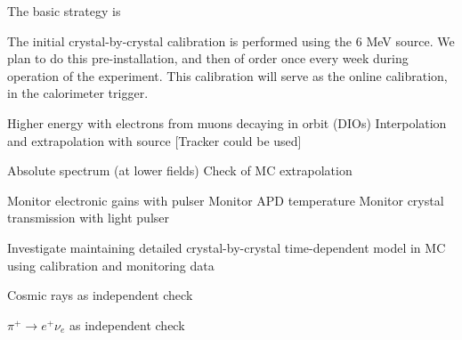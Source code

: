 The basic strategy is


 The initial crystal-by-crystal calibration is performed using the 6 MeV source. We plan to do this
pre-installation, and then of order once every week during operation of the experiment. This
calibration will serve as the online calibration, in the calorimeter trigger.

Higher energy with electrons from muons decaying in orbit (DIOs)
 Interpolation and extrapolation with source
 [Tracker could be used] 
 
Absolute spectrum (at lower fields)
 Check of MC extrapolation

Monitor electronic gains with pulser
 Monitor APD temperature
 Monitor crystal transmission with light pulser

 Investigate maintaining detailed crystal-by-crystal time-dependent model in MC
using calibration and monitoring data

Cosmic rays as independent check

$\pi^+\to e^+\nu_e$ as independent check
